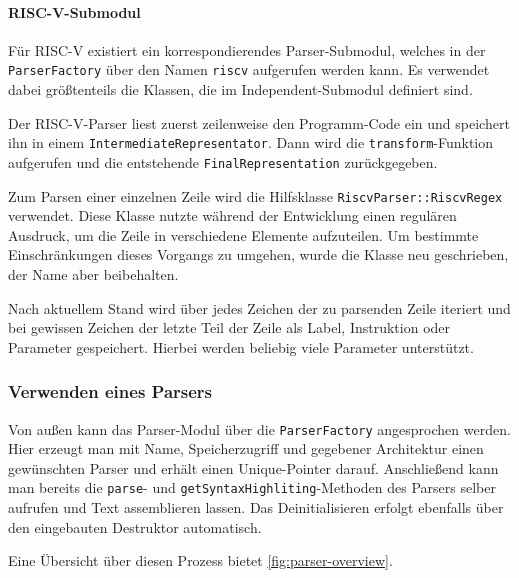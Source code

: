 \paragraph{RISC-V-Submodul}

Für RISC-V existiert ein korrespondierendes Parser-Submodul, welches in der
\texttt{ParserFactory} über den Namen \texttt{riscv} aufgerufen werden kann. Es
verwendet dabei größtenteils die Klassen, die im Independent-Submodul definiert
sind.

Der RISC-V-Parser liest zuerst zeilenweise den Programm-Code ein und speichert
ihn in einem \texttt{Intermediate\-Representator}. Dann wird die
\texttt{transform}-Funktion aufgerufen und die entstehende
\texttt{Final\-Representation} zurückgegeben.

Zum Parsen einer einzelnen Zeile wird die Hilfsklasse
\texttt{RiscvParser::\allowbreak{}RiscvRegex} verwendet. Diese Klasse nutzte
während der Entwicklung einen regulären Ausdruck, um die Zeile in
verschiedene Elemente aufzuteilen. Um bestimmte Einschränkungen dieses Vorgangs
zu umgehen, wurde die Klasse neu geschrieben, der Name aber beibehalten.

Nach aktuellem Stand wird über jedes Zeichen der zu parsenden Zeile iteriert und
bei gewissen Zeichen der letzte Teil der Zeile als Label, Instruktion oder
Parameter gespeichert. Hierbei werden beliebig viele Parameter unterstützt.

\subsubsection{Verwenden eines Parsers}

Von außen kann das Parser-Modul über die \texttt{ParserFactory} angesprochen
werden. Hier erzeugt man mit Name, Speicherzugriff und gegebener Architektur
einen gewünschten Parser und erhält einen Unique-Pointer darauf. Anschließend
kann man bereits die \texttt{parse}- und \texttt{getSyntaxHighliting}-Methoden
des Parsers selber aufrufen und Text assemblieren lassen. Das Deinitialisieren
erfolgt ebenfalls über den eingebauten Destruktor automatisch.

Eine Übersicht über diesen Prozess bietet \autoref{fig:parser-overview}.

